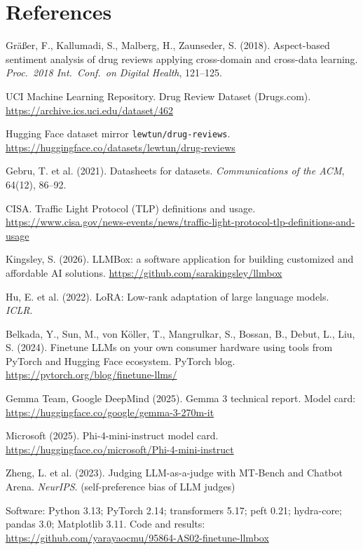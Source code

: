 \documentclass[11pt]{article}
\newcommand{\code}[1]{\texttt{#1}}
\begin{document}
\section*{References}
\begin{enumerate}[label={[\arabic*]}]
\item Gr\"a{\ss}er, F., Kallumadi, S., Malberg, H., Zaunseder, S. (2018). Aspect-based sentiment analysis of drug reviews applying cross-domain and cross-data learning. \emph{Proc.\ 2018 Int.\ Conf.\ on Digital Health}, 121--125.
\item UCI Machine Learning Repository. Drug Review Dataset (Drugs.com). \url{https://archive.ics.uci.edu/dataset/462}
\item Hugging Face dataset mirror \code{lewtun/drug-reviews}. \url{https://huggingface.co/datasets/lewtun/drug-reviews}
\item Gebru, T. et al. (2021). Datasheets for datasets. \emph{Communications of the ACM}, 64(12), 86--92.
\item CISA. Traffic Light Protocol (TLP) definitions and usage. \url{https://www.cisa.gov/news-events/news/traffic-light-protocol-tlp-definitions-and-usage}
\item Kingsley, S. (2026). LLMBox: a software application for building customized and affordable AI solutions. \url{https://github.com/sarakingsley/llmbox}
\item Hu, E. et al. (2022). LoRA: Low-rank adaptation of large language models. \emph{ICLR}.
\item Belkada, Y., Sun, M., von K\"oller, T., Mangrulkar, S., Bossan, B., Debut, L., Liu, S. (2024). Finetune LLMs on your own consumer hardware using tools from PyTorch and Hugging Face ecosystem. PyTorch blog. \url{https://pytorch.org/blog/finetune-llms/}
\item Gemma Team, Google DeepMind (2025). Gemma 3 technical report. Model card: \url{https://huggingface.co/google/gemma-3-270m-it}
\item Microsoft (2025). Phi-4-mini-instruct model card. \url{https://huggingface.co/microsoft/Phi-4-mini-instruct}
\item Zheng, L. et al. (2023). Judging LLM-as-a-judge with MT-Bench and Chatbot Arena. \emph{NeurIPS}. (self-preference bias of LLM judges)
\item Software: Python 3.13; PyTorch 2.14; transformers 5.17; peft 0.21; hydra-core; pandas 3.0; Matplotlib 3.11. Code and results: \url{https://github.com/yarayaocmu/95864-AS02-finetune-llmbox}
\end{enumerate}
\end{document}
